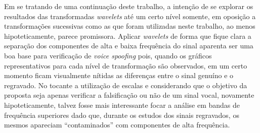     \par Em se tratando de uma continuação deste trabalho, a intenção de se explorar os resultados das transformadas \textit{wavelets} até um certo nível somente, em oposição a transformações sucessivas como as que foram utilizadas neste trabalho, ao menos hipoteticamente, parece promissora. Aplicar \textit{wavelets} de forma que fique clara a separação dos componentes de alta e baixa frequência do sinal aparenta ser uma boa base para verificação de \textit{voice spoofing} pois, quando os gráficos representativos para cada nível de transformação são observados, em um certo momento ficam visualmente nítidas as diferenças entre o sinal genuíno e o regravado. No tocante a utilização de escalas e considerando que o objetivo da proposta seja apenas verificar a falsificação ou não de um sinal vocal, novamente hipoteticamente, talvez fosse mais interessante focar a análise em bandas de frequência superiores dado que, durante os estudos dos sinais regravados, os mesmos apareciam 
   ``contaminados'' com componentes de alta frequência.
